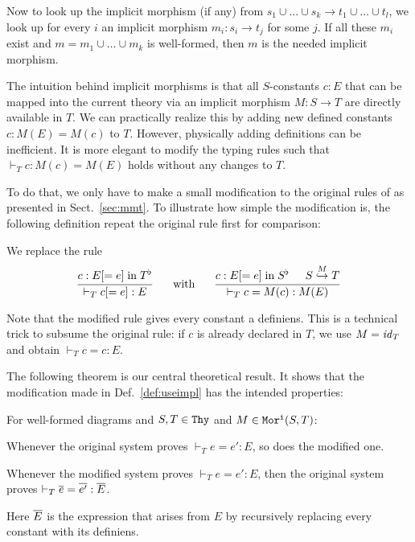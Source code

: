 \begin{union}
\begin{example}
Now to look up the implicit morphism (if any) from $s_1\cup\ldots\cup s_k\to t_1\cup\ldots\cup t_l$, we look up for every $i$ an implicit morphism $m_i:s_i\to t_j$ for some $j$.
If all these $m_i$ exist and $m=m_1\cup \ldots\cup m_k$ is well-formed, then $m$ is the needed implicit morphism.
\end{example}
\end{union}

The intuition behind implicit morphisms is that all $S$-constants $c:E$ that can be mapped into the current theory via an implicit morphism $M:S\to T$ are directly available in $T$.
We can practically realize this by adding new defined constants $c:M(E)=M(c)$ to $T$.
However, physically adding definitions can be inefficient.
It is more elegant to modify the typing rules such that $\vdash_T c:M(c)=M(E)$ holds without any changes to $T$.

To do that, we only have to make a small modification to the original rules of \mmt as presented in Sect.~\ref{sec:mmt}.
To illustrate how simple the modification is, the following definition repeat the original rule first for comparison:

\begin{definition}\label{def:useimpl}
We replace the rule
\[\rul{c:E[=e] \minn \flt{T}}{\vdash_T c[=e]:E} \tb \mwith\tb \rul{c:E[=e] \minn \flt{S}\tb \ipc{M}{S}{T}}{\vdash_T c=M(c):M(E)}\]
\end{definition}

Note that the modified rule gives every constant a definiens.
This is a technical trick to subsume the original rule: if $c$ is already declared in $T$, we use $M=\id{T}$ and obtain $\vdash_T c=c:E$.

The following theorem is our central theoretical result.
It shows that the modification made in Def.~\ref{def:useimpl} has the intended properties:
\begin{theorem}
For well-formed diagrams and $S,T\in\Thy$ and $M\in\IMo{S}{T}$:
\begin{compactenum}
 \item Whenever the original system proves $\vdash_T e=e':E$, so does the modified one.
 \item Whenever the modified system proves $\vdash_T e=e':E$, then the original system proves $\vdash_T \ov{e}=\ov{e'}:\ov{E}$.
\end{compactenum}
Here $\ov{E}$ is the expression that arises from $E$ by recursively replacing every constant with its definiens.
\end{theorem}

